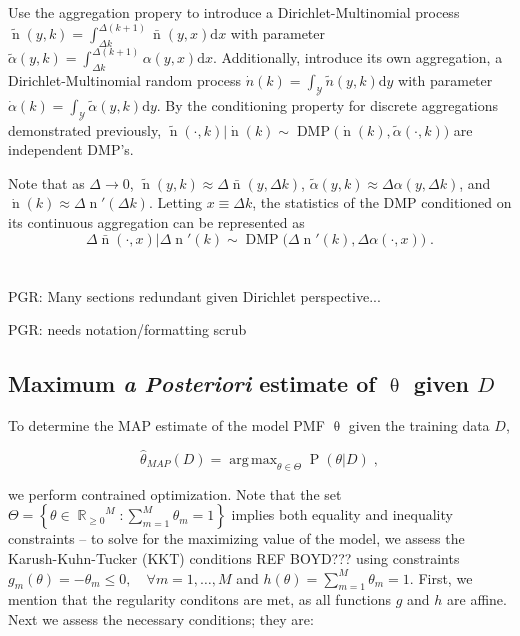 \documentclass[12pt]{report}
\DeclareMathOperator*{\argmax}{arg\,max}
\DeclareMathOperator{\nrm}{\mathrm{n}}
\DeclareMathOperator{\Prm}{\mathrm{P}}
\DeclareMathOperator{\Ycal}{\mathcal{Y}}
\DeclareMathOperator{\Rbb}{\mathbb{R}}
\DeclareMathOperator{\DMP}{\mathrm{DMP}}
\begin{document}
Use the aggregation propery to introduce a Dirichlet-Multinomial process $\tilde{\nrm}(y,k) = \int_{\Delta k}^{\Delta (k+1)} \bar{\nrm}(y,x) \mathrm{d}x$ with parameter $\tilde{\alpha}(y,k) = \int_{\Delta k}^{\Delta (k+1)} \alpha(y,x) \mathrm{d}x$. Additionally, introduce its own aggregation, a Dirichlet-Multinomial random process $\dot{n}(k) = \int_{\Ycal} \tilde{n}(y,k) \mathrm{d}y$ with parameter $\dot{\alpha}(k) = \int_{\Ycal} \tilde{\alpha}(y,k) \mathrm{d}y$. By the conditioning property for discrete aggregations demonstrated previously, $\tilde{\nrm}(\cdot,k) | \dot{\nrm}(k) \sim \DMP\big( \dot{\nrm}(k),\tilde{\alpha}(\cdot,k) \big)$ are independent DMP's.

Note that as $\Delta \to 0$, $\tilde{\nrm}(y,k) \approx \Delta \bar{\nrm}(y,\Delta k)$, $\tilde{\alpha}(y,k) \approx \Delta \alpha(y,\Delta k)$, and $\dot{\nrm}(k) \approx \Delta \nrm'(\Delta k)$. Letting $x \equiv \Delta k$, the statistics of the DMP conditioned on its continuous aggregation can be represented as
\begin{equation}
\Delta \bar{\nrm}(\cdot,x) | \Delta \nrm'(k) \sim \DMP\big( \Delta \nrm'(k), \Delta \alpha(\cdot,x) \big) \;.
\end{equation}







\chapter{}


PGR: Many sections redundant given Dirichlet perspective...

PGR: needs notation/formatting scrub






\section{Maximum \emph{a Posteriori} estimate of $\uptheta$ given $D$} \label{app:MAP_theta}

To determine the MAP estimate of the model PMF $\uptheta$ given the training data $D$, 

\begin{equation}
\hat{\theta}_{MAP}(D) = \argmax_{\theta \in \Theta} \Prm(\theta | D) \;,
\end{equation}

we perform contrained optimization. Note that the set $\Theta = \left\{ \theta \in {\Rbb_{\geq 0}}^{M}: \sum_{m=1}^{M} \theta_m = 1 \right\}$ implies both equality and inequality constraints -- to solve for the maximizing value of the model, we assess the Karush-Kuhn-Tucker (KKT) conditions REF BOYD??? using constraints $g_m(\theta) = -\theta_m \leq 0, \quad \forall m = 1,\ldots,M$ and $h(\theta) = \sum_{m=1}^M \theta_m = 1$. First, we mention that the regularity conditons are met, as all functions $g$ and $h$ are affine. Next we assess the necessary conditions; they are:
\end{document}
